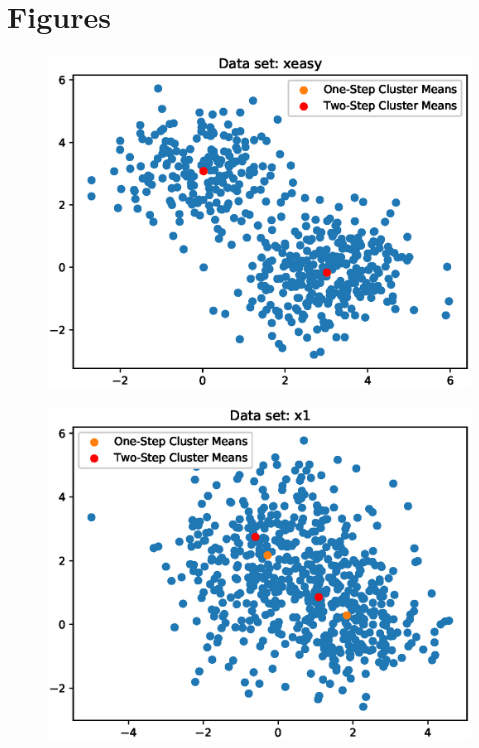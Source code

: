 \documentclass[UTF8]{article}
\begin{document}
\section{Figures}
\begin{figure}[H]
    \centering
    \includegraphics[scale=0.95]{./figures/xeasy.eps}
\end{figure}
\begin{figure}[H]
    \centering
    \includegraphics[scale=0.95]{./figures/x1.eps}
\end{figure}
\end{document}
